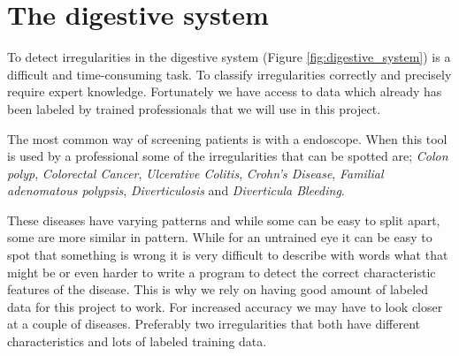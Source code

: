 \documentclass[english, a4paper]{article}
\begin{document}

\section{The digestive system}  \label{the_digestive_system}

To detect irregularities in the digestive system (Figure \ref{fig:digestive_system}) is a difficult and time-consuming task. To classify irregularities correctly and precisely require expert knowledge. Fortunately we have access to data which already has been labeled by trained professionals that we will use in this project.

The most common way of screening patients is with a endoscope. When this tool is used by a professional some of the irregularities that can be spotted are; \textit{Colon polyp}, \textit{Colorectal Cancer}, \textit{Ulcerative Colitis}, \textit{Crohn's Disease}, \textit{Familial adenomatous polypsis}, \textit{Diverticulosis} and \textit{Diverticula Bleeding}. 

These diseases have varying patterns and while some can be easy to split apart, some are more similar in pattern. While for an untrained eye it can be easy to spot that something is wrong it is very difficult to describe with words what that might be or even harder to write a program to detect the correct characteristic features of the disease. This is why we rely on having good amount of labeled data for this project to work. For increased accuracy we may have to look closer at a couple of diseases. Preferably two irregularities that both have different characteristics and lots of labeled training data.
\end{document}
